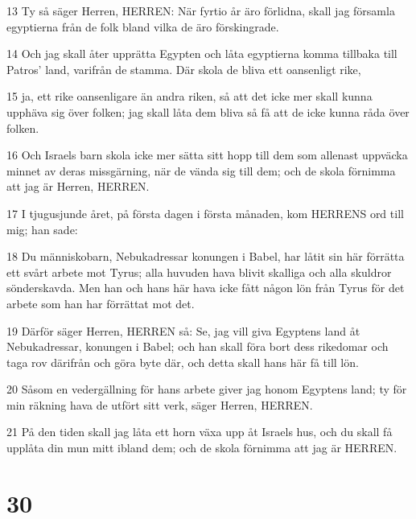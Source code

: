 \par 13 Ty så säger Herren, HERREN: När fyrtio år äro förlidna, skall jag församla egyptierna från de folk bland vilka de äro förskingrade.
\par 14 Och jag skall åter upprätta Egypten och låta egyptierna komma tillbaka till Patros' land, varifrån de stamma. Där skola de bliva ett oansenligt rike,
\par 15 ja, ett rike oansenligare än andra riken, så att det icke mer skall kunna upphäva sig över folken; jag skall låta dem bliva så få att de icke kunna råda över folken.
\par 16 Och Israels barn skola icke mer sätta sitt hopp till dem som allenast uppväcka minnet av deras missgärning, när de vända sig till dem; och de skola förnimma att jag är Herren, HERREN.
\par 17 I tjugusjunde året, på första dagen i första månaden, kom HERRENS ord till mig; han sade:
\par 18 Du människobarn, Nebukadressar konungen i Babel, har låtit sin här förrätta ett svårt arbete mot Tyrus; alla huvuden hava blivit skalliga och alla skuldror sönderskavda. Men han och hans här hava icke fått någon lön från Tyrus för det arbete som han har förrättat mot det.
\par 19 Därför säger Herren, HERREN så: Se, jag vill giva Egyptens land åt Nebukadressar, konungen i Babel; och han skall föra bort dess rikedomar och taga rov därifrån och göra byte där, och detta skall hans här få till lön.
\par 20 Såsom en vedergällning för hans arbete giver jag honom Egyptens land; ty för min räkning hava de utfört sitt verk, säger Herren, HERREN.
\par 21 På den tiden skall jag låta ett horn växa upp åt Israels hus, och du skall få upplåta din mun mitt ibland dem; och de skola förnimma att jag är HERREN.

\chapter{30}

